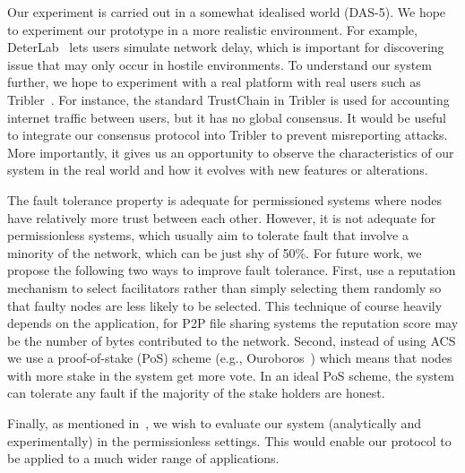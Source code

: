 Our experiment is carried out in a somewhat idealised world (DAS-5).
We hope to experiment our prototype in a more realistic environment.
For example, DeterLab~\cite{mirkovic2012teaching} lets users simulate network delay,
which is important for discovering issue that may only occur in hostile environments.
To understand our system further, we hope to experiment with a real platform with real users such as Tribler~\cite{pouwelse2008tribler}.
For instance, the standard TrustChain in Tribler is used for accounting internet traffic between users,
but it has no global consensus.
It would be useful to integrate our consensus protocol into Tribler to prevent misreporting attacks.
More importantly, it gives us an opportunity to observe the characteristics of our system in the real world and how it evolves with new features or alterations.

The fault tolerance property is adequate for permissioned systems where nodes have relatively more trust between each other.
However, it is not adequate for permissionless systems,
which usually aim to tolerate fault that involve a minority of the network,
which can be just shy of 50\%.
For future work, we propose the following two ways to improve fault tolerance.
First, use a reputation mechanism to select facilitators rather than simply selecting them randomly so that faulty nodes are less likely to be selected.
This technique of course heavily depends on the application,
for P2P file sharing systems the reputation score may be the number of bytes contributed to the network.
Second, instead of using ACS we use a proof-of-stake (PoS) scheme (e.g., Ouroboros~\cite{kiayias2017ouroboros}) which means that nodes with more stake in the system get more vote.
In an ideal PoS scheme, the system can tolerate any fault if the majority of the stake holders are honest.

Finally, as mentioned in~, we wish to evaluate our system (analytically and experimentally) in the permissionless settings.
This would enable our protocol to be applied to a much wider range of applications.
